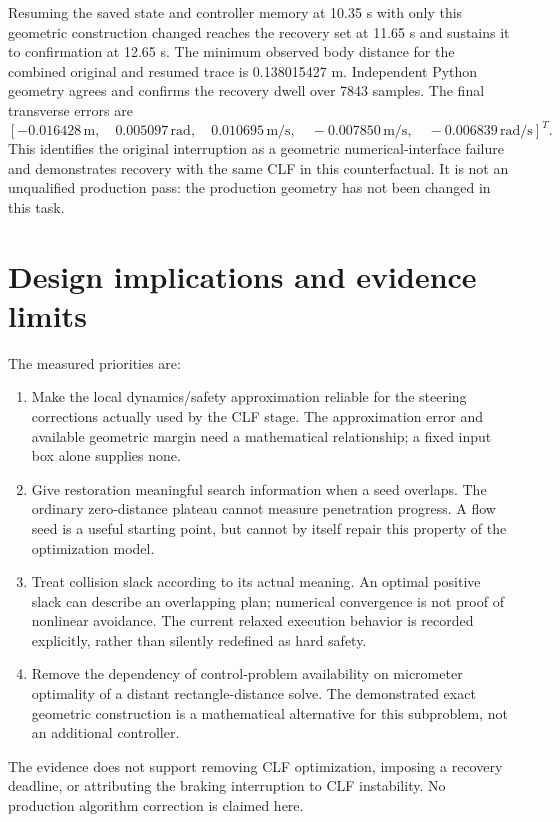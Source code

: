 \documentclass[11pt]{article}
\begin{document}
Resuming the saved state and controller memory at 10.35 s with only this
geometric construction changed reaches the recovery set at 11.65 s and
sustains it to confirmation at 12.65 s. The minimum observed body distance
for the combined original and resumed trace is 0.138015427 m. Independent
Python geometry agrees and confirms the recovery dwell over 7843 samples.
The final transverse errors are
\[
 [-0.016428\,\mathrm m,\quad0.005097\,\mathrm{rad},\quad
 0.010695\,\mathrm{m/s},\quad-0.007850\,\mathrm{m/s},\quad
 -0.006839\,\mathrm{rad/s}]^T.
\]
This identifies the original interruption as a geometric numerical-interface
failure and demonstrates recovery with the same CLF in this counterfactual.
It is not an unqualified production pass: the production geometry has not
been changed in this task.

\section{Design implications and evidence limits}
The measured priorities are:
\begin{enumerate}
\item Make the local dynamics/safety approximation reliable for the
steering corrections actually used by the CLF stage. The approximation
error and available geometric margin need a mathematical relationship;
a fixed input box alone supplies none.
\item Give restoration meaningful search information when a seed overlaps.
The ordinary zero-distance plateau cannot measure penetration progress.
A flow seed is a useful starting point, but cannot by itself repair this
property of the optimization model.
\item Treat collision slack according to its actual meaning. An optimal
positive slack can describe an overlapping plan; numerical convergence is
not proof of nonlinear avoidance. The current relaxed execution behavior
is recorded explicitly, rather than silently redefined as hard safety.
\item Remove the dependency of control-problem availability on micrometer
optimality of a distant rectangle-distance solve. The demonstrated exact
geometric construction is a mathematical alternative for this subproblem,
not an additional controller.
\end{enumerate}
The evidence does not support removing CLF optimization, imposing a recovery
deadline, or attributing the braking interruption to CLF instability.
No production algorithm correction is claimed here.
\end{document}
